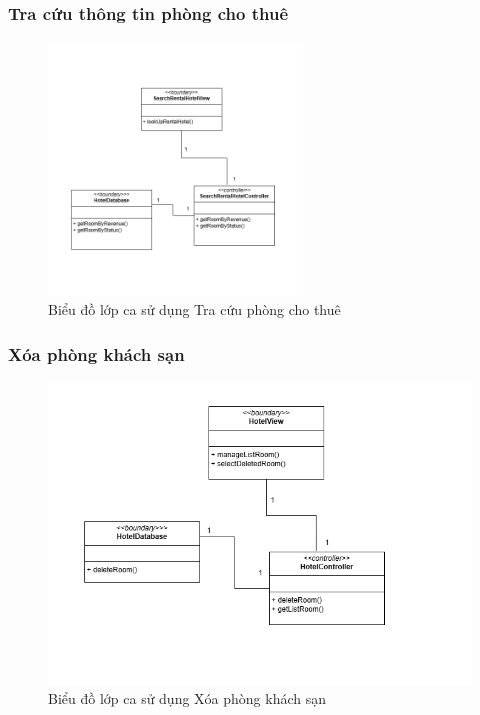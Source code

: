 \subsubsection{Tra cứu thông tin phòng cho thuê}
\begin{figure}[H]
    \centering
    \includegraphics[width=0.6\textwidth]{img2.2/tracuutrangthaiphong.png}
    \caption{Biểu đồ lớp ca sử dụng Tra cứu phòng cho thuê}
\end{figure}

\subsubsection{Xóa phòng khách sạn}
\begin{figure}[H]
    \centering
    \includegraphics[width=\textwidth]{img2.2/xoaphong.png}
    \caption{Biểu đồ lớp ca sử dụng Xóa phòng khách sạn}
\end{figure}

